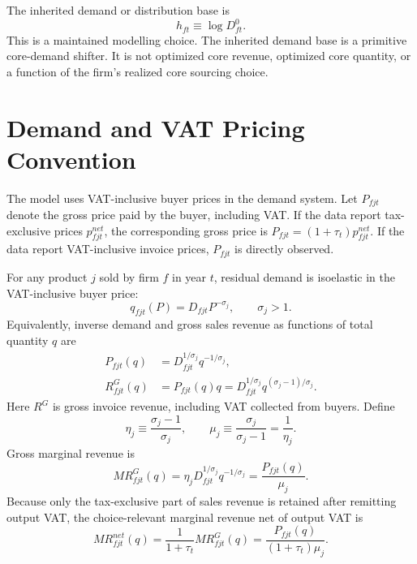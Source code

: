 \documentclass[11pt,a4paper]{article}
\begin{document}
The inherited demand or distribution base is
\begin{equation}
    h_{ft}\equiv \log D^0_{ft}.
    \label{eq:h_def}
\end{equation}
This is a maintained modelling choice. The inherited demand base is a primitive core-demand shifter. It is not optimized core revenue, optimized core quantity, or a function of the firm's realized core sourcing choice.

\section{Demand and VAT Pricing Convention}

The model uses VAT-inclusive buyer prices in the demand system. Let $P_{fjt}$ denote the gross price paid by the buyer, including VAT. If the data report tax-exclusive prices $p^{net}_{fjt}$, the corresponding gross price is $P_{fjt}=(1+\tau_t)p^{net}_{fjt}$. If the data report VAT-inclusive invoice prices, $P_{fjt}$ is directly observed.

For any product $j$ sold by firm $f$ in year $t$, residual demand is isoelastic in the VAT-inclusive buyer price:
\begin{equation}
    q_{fjt}(P)=D_{fjt}P^{-\sigma_j},
    \qquad \sigma_j>1.
    \label{eq:demand}
\end{equation}
Equivalently, inverse demand and gross sales revenue as functions of total quantity $q$ are
\begin{align}
    P_{fjt}(q)&=D_{fjt}^{1/\sigma_j}q^{-1/\sigma_j},
    \label{eq:inverse_demand}\\
    R^G_{fjt}(q)&=P_{fjt}(q)q
    =D_{fjt}^{1/\sigma_j}q^{(\sigma_j-1)/\sigma_j}.
    \label{eq:gross_revenue}
\end{align}
Here $R^G$ is gross invoice revenue, including VAT collected from buyers. Define
\begin{equation}
    \eta_j\equiv\frac{\sigma_j-1}{\sigma_j},
    \qquad
    \mu_j\equiv\frac{\sigma_j}{\sigma_j-1}=\frac{1}{\eta_j}.
    \label{eq:eta_mu}
\end{equation}
Gross marginal revenue is
\begin{equation}
    MR^G_{fjt}(q)
    =\eta_jD_{fjt}^{1/\sigma_j}q^{-1/\sigma_j}
    =\frac{P_{fjt}(q)}{\mu_j}.
    \label{eq:gross_mr}
\end{equation}
Because only the tax-exclusive part of sales revenue is retained after remitting output VAT, the choice-relevant marginal revenue net of output VAT is
\begin{equation}
    MR^{net}_{fjt}(q)
    =\frac{1}{1+\tau_t}MR^G_{fjt}(q)
    =\frac{P_{fjt}(q)}{(1+\tau_t)\mu_j}.
    \label{eq:net_mr}
\end{equation}
\end{document}

